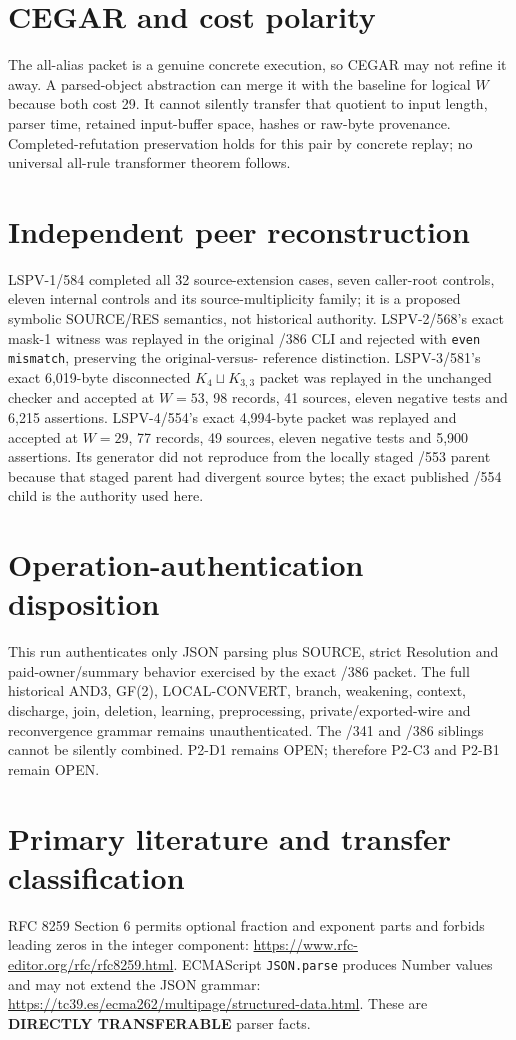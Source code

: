 \documentclass[11pt]{article}
\begin{document}
\section{CEGAR and cost polarity}
The all-alias packet is a genuine concrete execution, so CEGAR may not refine
it away.  A parsed-object abstraction can merge it with the baseline for
logical $W$ because both cost 29.  It cannot silently transfer that quotient
to input length, parser time, retained input-buffer space, hashes or raw-byte
provenance.  Completed-refutation preservation holds for this pair by
concrete replay; no universal all-rule transformer theorem follows.

\section{Independent peer reconstruction}
LSPV-1/584 completed all 32 source-extension cases, seven caller-root
controls, eleven internal controls and its source-multiplicity family; it is
a proposed symbolic SOURCE/RES semantics, not historical authority.
LSPV-2/568's exact mask-1 witness was replayed in the original /386 CLI and
rejected with \texttt{even mismatch}, preserving the original-versus-
reference distinction.  LSPV-3/581's exact 6,019-byte disconnected
$K_4\sqcup K_{3,3}$ packet was replayed in the unchanged checker and
accepted at $W=53$, 98 records, 41 sources, eleven negative tests and 6,215
assertions.  LSPV-4/554's exact 4,994-byte packet was replayed and accepted
at $W=29$, 77 records, 49 sources, eleven negative tests and 5,900
assertions.  Its generator did not reproduce from the locally staged /553
parent because that staged parent had divergent source bytes; the exact
published /554 child is the authority used here.

\section{Operation-authentication disposition}
This run authenticates only JSON parsing plus SOURCE, strict Resolution and
paid-owner/summary behavior exercised by the exact /386 packet.  The full
historical AND3, GF(2), LOCAL-CONVERT, branch, weakening, context, discharge,
join, deletion, learning, preprocessing, private/exported-wire and
reconvergence grammar remains unauthenticated.  The /341 and /386 siblings
cannot be silently combined.  P2-D1 remains OPEN; therefore P2-C3 and P2-B1
remain OPEN.

\section{Primary literature and transfer classification}
RFC 8259 Section 6 permits optional fraction and exponent parts and forbids
leading zeros in the integer component:
\url{https://www.rfc-editor.org/rfc/rfc8259.html}.  ECMAScript
\texttt{JSON.parse} produces Number values and may not extend the JSON
grammar:
\url{https://tc39.es/ecma262/multipage/structured-data.html}.  These are
\textbf{DIRECTLY TRANSFERABLE} parser facts.
\end{document}
